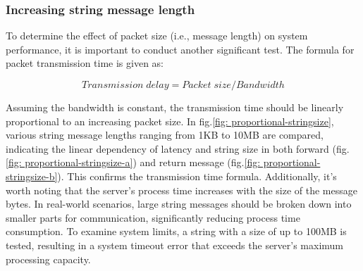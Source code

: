 \subsubsection{Increasing string message length}\label{chap: Result-Internal-string}
To determine the effect of packet size (i.e., message length) on system performance, 
it is important to conduct another significant test. The 
formula\cite{forouzan2004data}\cite{kurose2005computer} for packet transmission 
time is given as:


\begin{equation}
    Transmission \; delay = Packet \; size/Bandwidth
\end{equation}

Assuming the bandwidth is constant, the transmission time should be linearly proportional 
to an increasing packet size. In fig.\ref{fig: proportional-stringsize}, various string 
message lengths ranging from 1KB to 10MB are compared, indicating the linear dependency 
of latency and string size in both forward (fig.\ref{fig: proportional-stringsize-a}) 
and return message (fig.\ref{fig: proportional-stringsize-b}). This confirms the 
transmission time formula. Additionally, it's worth noting that the server's process 
time increases with the size of the message bytes. In real-world scenarios, large string 
messages should be broken down into smaller parts for communication, significantly 
reducing process time consumption. To examine system limits, a string with a size of 
up to 100MB is tested, resulting in a system timeout error that exceeds the server's 
maximum processing capacity.

